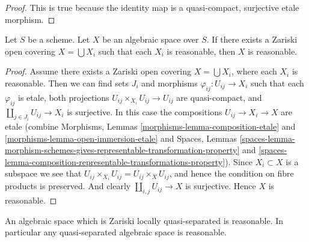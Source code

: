 \begin{proof}
This is true because the identity map is a quasi-compact, surjective
etale morphism.
\end{proof}

\begin{lemma}
\label{lemma-reasonable-Zariski-local}
Let $S$ be a scheme.
Let $X$ be an algebraic space over $S$.
If there exists a Zariski open covering $X = \bigcup X_i$ such that
each $X_i$ is reasonable, then $X$ is reasonable.
\end{lemma}

\begin{proof}
Assume there exists a Zariski open covering
$X = \bigcup X_i$, where each $X_i$ is reasonable.
Then we can find sets $J_i$ and morphisms
$\varphi_{ij} : U_{ij} \to X_i$ such that each $\varphi_{ij}$
is etale, both projections $U_{ij} \times_{X_i} U_{ij} \to U_{ij}$
are quasi-compact, and $\coprod_{j \in J_i} U_{ij} \to X_i$ is surjective.
In this case the compositions $U_{ij} \to X_i \to X$ are etale
(combine
Morphisms, Lemmas
\ref{morphisms-lemma-composition-etale}
and
\ref{morphisms-lemma-open-immersion-etale}
and
Spaces, Lemmas
\ref{spaces-lemma-morphism-schemes-gives-representable-transformation-property}
and
\ref{spaces-lemma-composition-representable-transformations-property}).
Since $X_i \subset X$ is a subspace we see that
$U_{ij} \times_{X_i} U_{ij} = U_{ij} \times_X U_{ij}$, and hence the
condition on fibre products is preserved. And clearly
$\coprod_{i, j} U_{ij} \to X$ is surjective. Hence $X$ is reasonable.
\end{proof}

\begin{lemma}
\label{lemma-quasi-separated-reasonable}
An algebraic space which is Zariski locally quasi-separated is reasonable.
In particular any quasi-separated algebraic space is reasonable.
\end{lemma}

